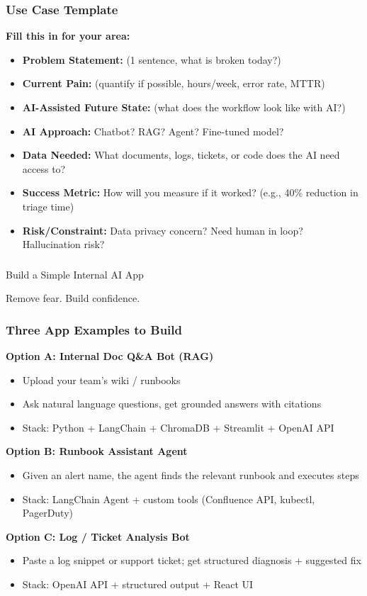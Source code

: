 \begin{frame}[fragile]\frametitle{Use Case Template}
\textbf{Fill this in for your area:}
\begin{itemize}
\item \textbf{Problem Statement:} (1 sentence, what is broken today?)
\item \textbf{Current Pain:} (quantify if possible, hours/week, error rate, MTTR)
\item \textbf{AI-Assisted Future State:} (what does the workflow look like with AI?)
\item \textbf{AI Approach:} Chatbot? RAG? Agent? Fine-tuned model?
\item \textbf{Data Needed:} What documents, logs, tickets, or code does the AI need access to?
\item \textbf{Success Metric:} How will you measure if it worked? (e.g., 40\% reduction in triage time)
\item \textbf{Risk/Constraint:} Data privacy concern? Need human in loop? Hallucination risk?
\end{itemize}
\end{frame}

\begin{frame}[fragile]\frametitle{}
\begin{center}
{\Large Build a Simple Internal AI App}

{\small Remove fear. Build confidence.}
\end{center}
\end{frame}

\begin{frame}[fragile]\frametitle{Three App Examples to Build}
\textbf{Option A: Internal Doc Q\&A Bot (RAG)}
\begin{itemize}
\item Upload your team's wiki / runbooks
\item Ask natural language questions, get grounded answers with citations
\item Stack: Python + LangChain + ChromaDB + Streamlit + OpenAI API
\end{itemize}

\textbf{Option B: Runbook Assistant Agent}
\begin{itemize}
\item Given an alert name, the agent finds the relevant runbook and executes steps
\item Stack: LangChain Agent + custom tools (Confluence API, kubectl, PagerDuty)
\end{itemize}

\textbf{Option C: Log / Ticket Analysis Bot}
\begin{itemize}
\item Paste a log snippet or support ticket; get structured diagnosis + suggested fix
\item Stack: OpenAI API + structured output + React UI
\end{itemize}
\end{frame}

